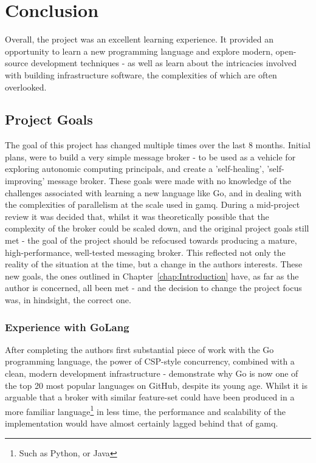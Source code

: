 \chapter{Conclusion}
\label{chap:Conclusion}

Overall, the project was an excellent learning experience. It provided an
opportunity to learn a new programming language and explore modern, open-source
development techniques - as well as learn about the intricacies involved with
building infrastructure software, the complexities of which are often
overlooked.

\section{Project Goals}
\label{sec:goalsConclusion}

The goal of this project has changed multiple times over the last 8 months.
Initial plans, were to build a very simple message broker - to be used as a
vehicle for exploring autonomic computing principals, and create a
'self-healing', 'self-improving' message broker. These goals were made with no
knowledge of the challenges associated with learning a new language like Go, and
in dealing with the complexities of parallelism at the scale used in \gls{gamq}.
During a mid-project review it was decided that, whilst it was theoretically
possible that the complexity of the broker could be scaled down, and the
original project goals still met - the goal of the project should be refocused
towards producing a mature, high-performance, well-tested messaging broker. This
reflected not only the reality of the situation at the time, but a change in the
authors interests. These new goals, the ones outlined in
Chapter~\ref{chap:Introduction} have, as far as the author is concerned, all
been met - and the decision to change the project focus was, in hindsight, the
correct one.

\subsection{Experience with GoLang}
\label{sub:golangConclusion}

After completing the authors first substantial piece of work with the Go
programming language, the power of CSP-style concurrency, combined with a clean,
modern development infrastructure - demonstrate why Go is now one of the top 20
most popular languages on GitHub\cite{languageRankings}, despite its young age.
Whilst it is arguable that a broker with similar feature-set could have been
produced in a more familiar language\footnote{Such as Python, or Java} in less
time, the performance and scalability of the implementation would have almost
certainly lagged behind that of gamq.

